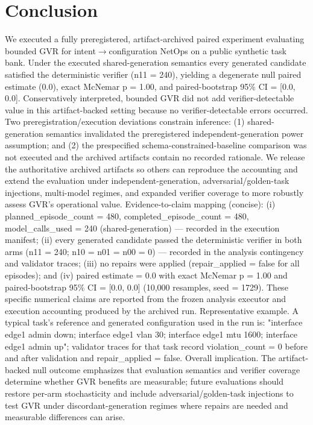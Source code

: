 \documentclass[conference]{IEEEtran}
\begin{document}
\section{Conclusion}
We executed a fully preregistered, artifact-archived paired experiment evaluating bounded GVR for intent\ensuremath{\rightarrow}configuration NetOps on a public synthetic task bank. Under the executed shared-generation semantics every generated candidate satisfied the deterministic verifier (n11 = 240), yielding a degenerate null paired estimate (0.0), exact McNemar p = 1.00, and paired-bootstrap 95\% CI = [0.0, 0.0]. Conservatively interpreted, bounded GVR did not add verifier-detectable value in this artifact-backed setting because no verifier-detectable errors occurred. Two preregistration/execution deviations constrain inference: (1) shared-generation semantics invalidated the preregistered independent-generation power assumption; and (2) the prespecified schema-constrained-baseline comparison was not executed and the archived artifacts contain no recorded rationale. We release the authoritative archived artifacts so others can reproduce the accounting and extend the evaluation under independent-generation, adversarial/golden-task injections, multi-model regimes, and expanded verifier coverage to more robustly assess GVR's operational value. Evidence-to-claim mapping (concise): (i) planned\_episode\_count = 480, completed\_episode\_count = 480, model\_calls\_used = 240 (shared-generation) --- recorded in the execution manifest; (ii) every generated candidate passed the deterministic verifier in both arms (n11 = 240; n10 = n01 = n00 = 0) --- recorded in the analysis contingency and validator traces; (iii) no repairs were applied (repair\_applied = false for all episodes); and (iv) paired estimate = 0.0 with exact McNemar p = 1.00 and paired-bootstrap 95\% CI = [0.0, 0.0] (10,000 resamples, seed = 1729). These specific numerical claims are reported from the frozen analysis executor and execution accounting produced by the archived run. Representative example. A typical task's reference and generated configuration used in the run is: "interface edge1 admin down; interface edge1 vlan 30; interface edge1 mtu 1600; interface edge1 admin up"; validator traces for that task record violation\_count = 0 before and after validation and repair\_applied = false. Overall implication. The artifact-backed null outcome emphasizes that evaluation semantics and verifier coverage determine whether GVR benefits are measurable; future evaluations should restore per-arm stochasticity and include adversarial/golden-task injections to test GVR under discordant-generation regimes where repairs are needed and measurable differences can arise.
\end{document}
